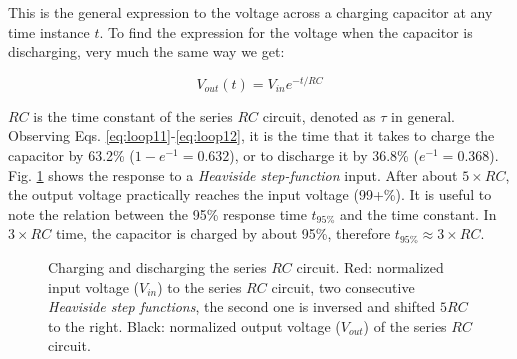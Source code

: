 This is the general expression to the voltage across a charging capacitor at any time instance $t$.
To find the expression for the voltage when the capacitor is discharging, very much the same way we get:

\begin{equation}
\label{eq:loop12}
        V_{out}(t) = V_{in}e^{-t/RC}
\end{equation}

$RC$ is the time constant of the series $RC$ circuit, denoted as $\tau$ in general.
Observing Eqs. \ref{eq:loop11}-\ref{eq:loop12}, it is the time that it takes to charge the capacitor by 63.2\% ($1 - e^{-1} = 0.632$), or to discharge it by 36.8\% ($e^{-1} = 0.368$).
Fig. \ref{fig:charge_discharge} shows the response to a \emph{Heaviside step-function} input.
After about $5 \times RC$, the output voltage practically reaches the input voltage (99+\%).
It is useful to note the relation between the 95\% response time $t_{95\%}$ and the time constant.
In $3 \times RC$ time, the capacitor is charged by about 95\%, therefore $t_{95\%} \approx 3\times RC$.

\begin{figure}
\centering
{}
\caption[Charging and discharging the series $RC$ circuit.]{Charging and discharging the series $RC$ circuit.
Red: normalized input voltage ($V_{in}$) to the series $RC$ circuit, two consecutive \emph{Heaviside step functions}, the second one is inversed and shifted $5RC$ to the right.
Black: normalized output voltage ($V_{out}$) of the series $RC$ circuit.}
\label{fig:charge_discharge}
\end{figure}

